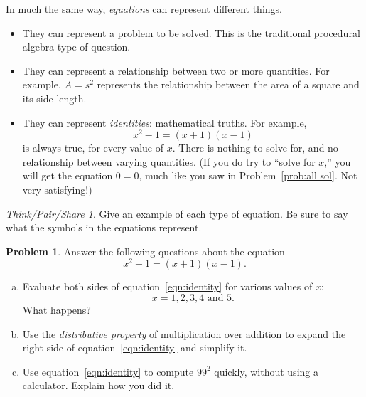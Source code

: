 \documentclass[12pt, reqno]{amsart}
\theoremstyle{remark}
\newtheorem*{thinkpair*}{Think/Pair/Share}
\theoremstyle{definition}
\newtheorem{problem}{Problem}
\numberwithin{equation}{section}  %
\begin{document}
In much the same way, \emph{equations} can represent different things.
\begin{itemize}
\item
They can represent a problem to be solved.  This is the traditional procedural algebra type of question.\\
\item
They can represent a relationship between two or more quantities.  For example, $A = s^2$ represents the relationship between the area of a square and its side length.\\
\item
They can represent \emph{identities}: mathematical truths.  For example, 
\[
x^2 - 1 = (x+1)(x-1)
\]
 is always true, for every value of $x$.  There is nothing to solve for, and no relationship between varying quantities.  (If you do try to ``solve for $x$,'' you will get the equation $0=0$, much like you saw in Problem~\ref{prob:all sol}.  Not very satisfying!)\\
\end{itemize}


\bigskip


\begin{thinkpair*}
Give an example of each type of equation.  Be sure to say what the symbols in the equations represent.
\end{thinkpair*}


\bigskip
\bigskip

\begin{problem}
Answer the following questions about the equation
\begin{equation}\label{eqn:identity}
x^2 - 1 = (x+1)(x-1).
\end{equation}
\begin{enumerate}[(a)]
\item
Evaluate both sides of equation~\ref{eqn:identity} for various values of $x$: 
\[
x = 1, 2, 3, 4 \text{ and } 5.
\]
What happens?\\

\item 
Use the \emph{distributive property} of multiplication over addition to expand the right side of equation~\ref{eqn:identity} and simplify it.  \\

\item
Use equation~\ref{eqn:identity} to compute $99^2$ quickly, without using a calculator.  Explain how you did it.
\end{enumerate}

\end{problem}
\end{document}
